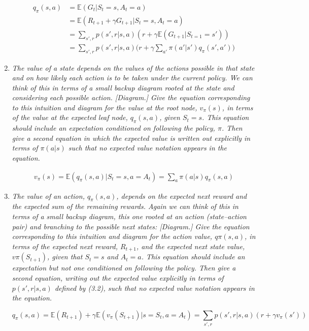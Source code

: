 \documentclass[12pt,a4paper]{article}
\begin{document}
\begin{enumerate}
  \begin{align*}
  q_\pi(s, a) & = \mathbb{E}(G_t | S_t = s, A_t = a)\\
  & = \mathbb{E}(R_{t + 1} + \gamma G_{t + 1} | S_t = s, A_t = a)\\
  & = \sum\limits_{s', r} p(s', r | s, a) (r + \gamma \mathbb{E} (G_{t + 1} | S_{t = 1} = s'))\\
  & = \sum\limits_{s', r} p(s', r | s, a) \Big(r + \gamma \sum\limits_{a'}\pi(a' | s') q_\pi(s', a')\Big)
  \end{align*}

\item
 \textit{The value of a state depends on the values of the actions possible in that
  state and on how likely each action is to be taken under the current policy. We can
  think of this in terms of a small backup diagram rooted at the state and considering each
  possible action. [Diagram.]
  Give the equation corresponding to this intuition and diagram for the value at the root
  node, $v_\pi(s)$, in terms of the value at the expected leaf node, $q_\pi(s, a)$, given
  $S_t = s$. This equation should include an expectation conditioned on following the policy,
  $\pi$. Then give a second equation in which the expected value is written out explicitly
  in terms of $\pi(a|s)$ such that no expected value notation appears in the equation.}

  \begin{align*}
    v_\pi(s) = \mathbb{E}(q_\pi(s, a) | S_t = s, a = A_t) = \sum\limits_a \pi(a|s) q_\pi(s, a)
  \end{align*}

\item
  \textit{The value of an action, $q_\pi(s, a)$, depends on the expected next reward and
  the expected sum of the remaining rewards. Again we can think of this in terms of a
  small backup diagram, this one rooted at an action (state–action pair) and branching to
  the possible next states: [Diagram.]
  Give the equation corresponding to this intuition and diagram for the action value,
  $q\pi(s, a)$, in terms of the expected next reward, $R_{t+1}$, and the expected next state value,
  $v\pi(S_{t+1})$, given that $S_t = s$ and $A_t = a$. This equation should include an expectation but
  not one conditioned on following the policy. Then give a second equation, writing out the
  expected value explicitly in terms of $p(s', r|s, a)$ defined by (3.2), such that no expected
  value notation appears in the equation.}

  \[q_\pi(s, a) = \mathbb{E}(R_{t + 1}) + \gamma \mathbb{E} (v_\pi (S_{t + 1}) | s = S_t, a = A_t)
  = \sum\limits_{s', r} p(s', r | s, a) (r + \gamma v_\pi(s'))\]


\end{enumerate}
\end{document}
